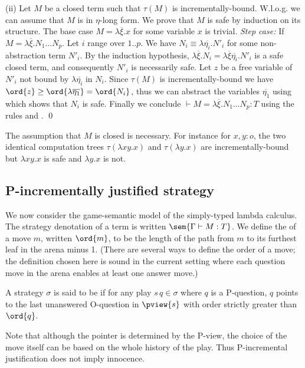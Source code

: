 (ii) Let $M$ be a closed term such that $\tau(M)$ is
incrementally-bound.  W.l.o.g. we can assume that $M$ is in $\eta$-long
form.  We prove that $M$ is safe by induction on its structure. The
base case $M = \lambda \overline{\xi} . x$ for some variable $x$ is
trivial.  \emph{Step case:} If $M = \lambda \overline{\xi} . N_1
\ldots N_p$.  Let $i$ range over $1..p$. We have $N_i \equiv \lambda
\overline{\eta_i} . N'_i$ for some non-abstraction term $N'_i$. By
the induction hypothesis, $\lambda \overline{\xi} . N_i = \lambda
\overline{\xi} \overline{\eta_i} . N'_i$ is a safe closed term, and
consequently $N'_i$ is necessarily safe. Let $z$ be a free variable
of $N'_i$ not bound by $\lambda \overline{\eta_i}$ in $N_i$. Since
$\tau(M)$ is incrementally-bound we have $\ord{z} \geq \ord{\lambda
  \overline{\eta_1}} = \ord{N_i}$, thus we can abstract the variables $\overline{\eta_1}$ using  which shows that $N_i$ is safe.  Finally
we conclude $\vdash M = \lambda \overline{\xi} . N_1 \ldots N_p : T$
using the rules  and .  \qed



The assumption that $M$ is closed is necessary. For instance for
$x,y:o$, the two identical computation trees $\tau(\lambda x y .x)$
and $\tau(\lambda y . x)$ are incrementally-bound but $\lambda x y
.x$ is safe and $\lambda y . x$ is not.

\subsection*{P-incrementally justified strategy}

We now consider the game-semantic model of the simply-typed lambda
calculus. The strategy denotation of a term is written $\sem{\Gamma
\vdash M : T}$. We define the  of a move $m$, written
$\ord{m}$, to be the length of the path from $m$ to its furthest
leaf in the arena minus 1. (There are several ways to define the
order of a move; the definition chosen here is sound in the current
setting where each question move in the arena enables at least one
answer move.)

\begin{definition}\rm
  A strategy $\sigma$ is said to be  if for any play $s \, q \in \sigma$ where $q$ is a
  P-question, $q$ points to the last unanswered O-question in $\pview{s}$ with
  order strictly greater than $\ord{q}$.
\end{definition}
Note that although the pointer is determined by the P-view, the
choice of the move itself can be based on the whole history of the
play. Thus P-incremental justification does not imply innocence.

